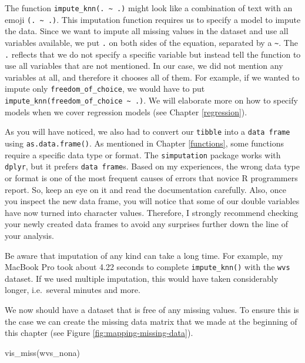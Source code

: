 \documentclass[
]{book}
\newenvironment{Shaded}{\begin{snugshade}}{\end{snugshade}}
\newcommand{\FunctionTok}[1]{\textcolor[rgb]{0.00,0.00,0.00}{#1}}
\newcommand{\NormalTok}[1]{#1}
\begin{document}
The function \texttt{impute\_knn(.\ \textasciitilde{}\ .)} might look like a combination of text with an emoji \texttt{(.\ \textasciitilde{}\ .)}. This imputation function requires us to specify a model to impute the data. Since we want to impute all missing values in the dataset and use all variables available, we put \texttt{.} on both sides of the equation, separated by a \texttt{\textasciitilde{}}. The \texttt{.} reflects that we do not specify a specific variable but instead tell the function to use all variables that are not mentioned. In our case, we did not mention any variables at all, and therefore it chooses all of them. For example, if we wanted to impute only \texttt{freedom\_of\_choice}, we would have to put \texttt{impute\_knn(freedom\_of\_choice\ \textasciitilde{}\ .)}. We will elaborate more on how to specify models when we cover regression models (see Chapter \ref{regression}).

As you will have noticed, we also had to convert our \texttt{tibble} into a \texttt{data\ frame} using \texttt{as.data.frame()}. As mentioned in Chapter \ref{functions}, some functions require a specific data type or format. The \texttt{simputation} package works with \texttt{dplyr}, but it prefers \texttt{data\ frame}s. Based on my experiences, the wrong data type or format is one of the most frequent causes of errors that novice R programmers report. So, keep an eye on it and read the documentation carefully. Also, once you inspect the new data frame, you will notice that some of our double variables have now turned into character values. Therefore, I strongly recommend checking your newly created data frames to avoid any surprises further down the line of your analysis.

Be aware that imputation of any kind can take a long time. For example, my MacBook Pro took about 4.22 seconds to complete \texttt{impute\_knn()} with the \texttt{wvs} dataset. If we used multiple imputation, this would have taken considerably longer, i.e.~several minutes and more.

We now should have a dataset that is free of any missing values. To ensure this is the case we can create the missing data matrix that we made at the beginning of this chapter (see Figure \ref{fig:mapping-missing-data}).

\begin{Shaded}
\begin{Highlighting}[]
\FunctionTok{vis\_miss}\NormalTok{(wvs\_nona)}
\end{Highlighting}
\end{Shaded}
\end{document}

